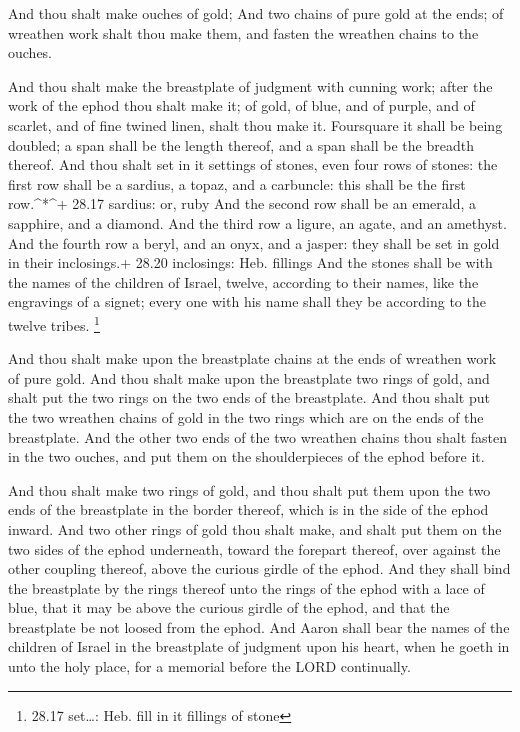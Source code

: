  And thou shalt make ouches of gold;  And two
chains of pure gold at the ends; of wreathen work shalt thou make them,
and fasten the wreathen chains to the ouches.

 And thou shalt make the breastplate of judgment with
cunning work; after the work of the ephod thou shalt make it; of gold,
of blue, and of purple, and of scarlet, and of fine twined linen, shalt
thou make it.  Foursquare it shall be being doubled; a span
shall be the length thereof, and a span shall be the breadth thereof.
 And thou shalt set in it settings of stones, even four
rows of stones: the first row shall be a sardius, a topaz, and a
carbuncle: this shall be the first row.\^{}*\^{}+ 28.17 sardius: or,
ruby  And the second row shall be an emerald, a sapphire,
and a diamond.  And the third row a ligure, an agate, and
an amethyst.  And the fourth row a beryl, and an onyx, and
a jasper: they shall be set in gold in their inclosings.+ 28.20
inclosings: Heb. fillings  And the stones shall be with the
names of the children of Israel, twelve, according to their names, like
the engravings of a signet; every one with his name shall they be
according to the twelve tribes. \footnote{28.17 set\ldots: Heb. fill in
  it fillings of stone}

 And thou shalt make upon the breastplate chains at the
ends of wreathen work of pure gold.  And thou shalt make
upon the breastplate two rings of gold, and shalt put the two rings on
the two ends of the breastplate.  And thou shalt put the
two wreathen chains of gold in the two rings which are on the ends of
the breastplate.  And the other two ends of the two
wreathen chains thou shalt fasten in the two ouches, and put them on the
shoulderpieces of the ephod before it.

 And thou shalt make two rings of gold, and thou shalt put
them upon the two ends of the breastplate in the border thereof, which
is in the side of the ephod inward.  And two other rings of
gold thou shalt make, and shalt put them on the two sides of the ephod
underneath, toward the forepart thereof, over against the other coupling
thereof, above the curious girdle of the ephod.  And they
shall bind the breastplate by the rings thereof unto the rings of the
ephod with a lace of blue, that it may be above the curious girdle of
the ephod, and that the breastplate be not loosed from the ephod.
 And Aaron shall bear the names of the children of Israel
in the breastplate of judgment upon his heart, when he goeth in unto the
holy place, for a memorial before the LORD continually.

